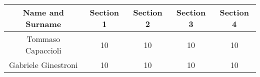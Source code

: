 \begin{tabular}{|c|c|c|c|c|}
    \hline
    \textbf{Name and Surname} & \textbf{Section 1} & \textbf{Section 2} & \textbf{Section 3} & \textbf{Section 4} \\
    \hline
    Tommaso Capaccioli & 10 & 10 & 10 & 10 \\
    \hline
    Gabriele Ginestroni & 10 & 10 & 10 & 10 \\
    \hline
\end{tabular}